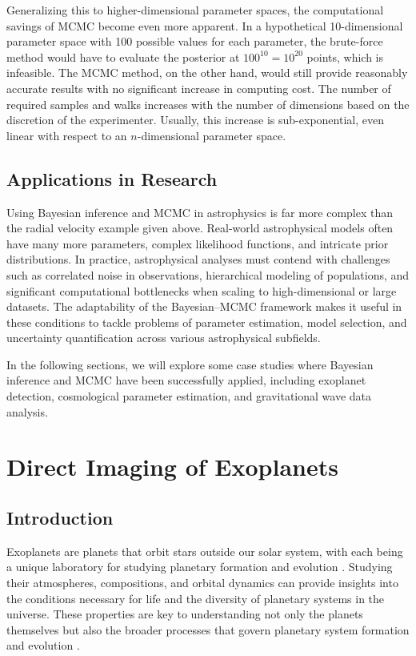 \documentclass[preprint,longauthor]{aastex631}
\numberwithin{equation}{section}
\begin{document}
Generalizing this to higher-dimensional parameter spaces, the computational savings of MCMC become even more apparent. In a hypothetical 10-dimensional parameter space with 100 possible values for each parameter, the brute-force method would have to evaluate the posterior at $100^{10} = 10^{20}$ points, which is infeasible. The MCMC method, on the other hand, would still provide reasonably accurate results with no significant increase in computing cost. The number of required samples and walks increases with the number of dimensions based on the discretion of the experimenter. Usually, this increase is sub-exponential, even linear with respect to an $n$-dimensional parameter space.

\subsection{Applications in Research}

Using Bayesian inference and MCMC in astrophysics is far more complex than the radial velocity example given above. Real-world astrophysical models often have many more parameters, complex likelihood functions, and intricate prior distributions. In practice, astrophysical analyses must contend with challenges such as correlated noise in observations, hierarchical modeling of populations, and significant computational bottlenecks when scaling to high-dimensional or large datasets. The adaptability of the Bayesian–MCMC framework makes it useful in these conditions to tackle problems of parameter estimation, model selection, and uncertainty quantification across various astrophysical subfields.

In the following sections, we will explore some case studies where Bayesian inference and MCMC have been successfully applied, including exoplanet detection, cosmological parameter estimation, and gravitational wave data analysis.

\section{Direct Imaging of Exoplanets}
\label{sec:CaseStudies}

\subsection{Introduction}

Exoplanets are planets that orbit stars outside our solar system, with each being a unique laboratory for studying planetary formation and evolution \citep{kaushikExoplanetDetectionDetailed2025}. Studying their atmospheres, compositions, and orbital dynamics can provide insights into the conditions necessary for life and the diversity of planetary systems in the universe. These properties are key to understanding not only the planets themselves but also the broader processes that govern planetary system formation and evolution \citep{madhusudhanExoplanetaryAtmospheresKey2019}.
\end{document}
